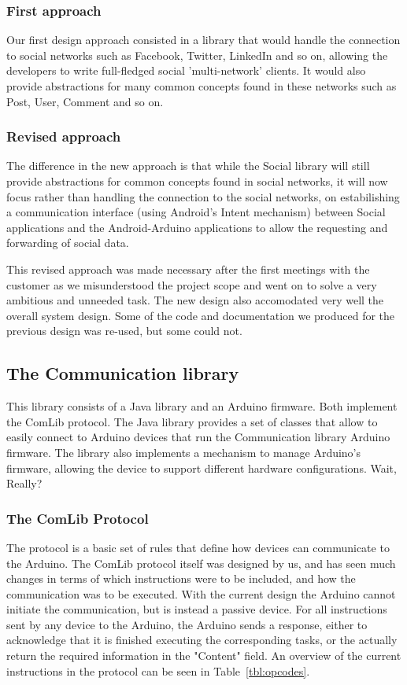 \subsubsection{First approach}
Our first design approach consisted in a library that would handle the connection to social networks
such as Facebook, Twitter, LinkedIn and so on, allowing the developers to write full-fledged
social 'multi-network' clients. It would also provide abstractions for many common concepts
found in these networks such as Post, User, Comment and so on.

\subsubsection{Revised approach}
The difference in the new approach is that while the Social library will still provide
abstractions for common concepts found in social networks, it will now focus rather than handling
the connection to the social networks, on estabilishing a communication interface (using Android's Intent mechanism)
between Social applications and the Android-Arduino applications to allow the requesting and forwarding of social data.

This revised approach was made necessary after the first meetings with the customer
as we misunderstood the project scope and went on to solve a very ambitious and unneeded task.
The new design also accomodated very well the overall system design. Some of the code and documentation we produced
for the previous design was re-used, but some could not.


\newpage

\subsection{The Communication library}
This library consists of a Java library and an Arduino firmware. Both implement the ComLib protocol.
The Java library provides a set of classes that allow to easily connect to Arduino devices that run the Communication library
Arduino firmware. The library also implements a mechanism to manage Arduino's firmware, allowing the device to support
different hardware configurations. Wait, Really?


\subsubsection{The ComLib Protocol}
The protocol is a basic set of rules that define how devices can communicate to the Arduino.
The ComLib protocol itself was designed by us, and has seen much changes in terms of which instructions were to be included,
and how the communication was to be executed. With the current design the Arduino cannot initiate the communication,
but is instead a passive device. For all instructions sent by any device to the Arduino, the Arduino sends a response,
either to acknowledge that it is finished executing the corresponding tasks, or the actually return the required
information in the "Content" field. An overview of the current instructions in the protocol can be seen in Table~\ref{tbl:opcodes}.

